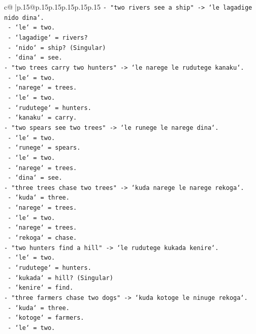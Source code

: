 \documentclass{article}
\begin{document}
{\begin{supertabular}{c@{$\;$}|p{.15\linewidth}@{}p{.15\linewidth}p{.15\linewidth}p{.15\linewidth}p{.15\linewidth}p{.15\linewidth}}
{{{\texttt{{-} "two rivers see a ship" {-}> `le lagadige nido dina`.} \\
\texttt{  {-} `le` = two.} \\
\texttt{  {-} `lagadige` = rivers?} \\
\texttt{  {-} `nido` = ship? (Singular)} \\
\texttt{  {-} `dina` = see.} \\
\texttt{{-} "two trees carry two hunters" {-}> `le narege le rudutege kanaku`.} \\
\texttt{  {-} `le` = two.} \\
\texttt{  {-} `narege` = trees.} \\
\texttt{  {-} `le` = two.} \\
\texttt{  {-} `rudutege` = hunters.} \\
\texttt{  {-} `kanaku` = carry.} \\
\texttt{{-} "two spears see two trees" {-}> `le runege le narege dina`.} \\
\texttt{  {-} `le` = two.} \\
\texttt{  {-} `runege` = spears.} \\
\texttt{  {-} `le` = two.} \\
\texttt{  {-} `narege` = trees.} \\
\texttt{  {-} `dina` = see.} \\
\texttt{{-} "three trees chase two trees" {-}> `kuda narege le narege rekoga`.} \\
\texttt{  {-} `kuda` = three.} \\
\texttt{  {-} `narege` = trees.} \\
\texttt{  {-} `le` = two.} \\
\texttt{  {-} `narege` = trees.} \\
\texttt{  {-} `rekoga` = chase.} \\
\texttt{{-} "two hunters find a hill" {-}> `le rudutege kukada kenire`.} \\
\texttt{  {-} `le` = two.} \\
\texttt{  {-} `rudutege` = hunters.} \\
\texttt{  {-} `kukada` = hill? (Singular)} \\
\texttt{  {-} `kenire` = find.} \\
\texttt{{-} "three farmers chase two dogs" {-}> `kuda kotoge le ninuge rekoga`.} \\
\texttt{  {-} `kuda` = three.} \\
\texttt{  {-} `kotoge` = farmers.} \\
\texttt{  {-} `le` = two.} \\
}}}
\end{supertabular}}
\end{document}
